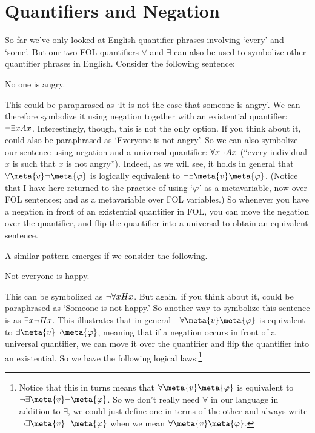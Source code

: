 \section{Quantifiers and Negation}




So far we've only looked at English quantifier phrases involving `every' and `some'.  But our two FOL quantifiers $\forall$ and $\exists$ can also be used to symbolize other quantifier phrases in English.  Consider the following sentence:
	\begin{earg}
		\item[\ex{q.neg1}] No one is angry.
	\end{earg}
This could be paraphrased as `It is not the case that someone is angry'.  We can therefore symbolize it using negation together with an existential quantifier: $\neg \exists x Ax$.  Interestingly, though, this is not the only option.  If you think about it,  could also be paraphrased as `Everyone is not-angry'. So we can also symbolize our sentence  using negation and a universal quantifier: $\forall x \neg Ax$ (``every individual $x$ is such that $x$ is not angry''). Indeed, as we will see, it holds in general that $\forall \meta{v} \enot\meta{\varphi}$ is logically equivalent to $\enot\exists \meta{v}\meta{\varphi}$. (Notice that I have here returned to the practice of using `$\mathcal{\varphi}$' as a metavariable, now over FOL sentences; and  as a metavariable over FOL variables.)   So whenever you have a negation in front of an existential quantifier in FOL, you can move the negation over the quantifier, and flip the quantifier into a universal to obtain an equivalent sentence.

A similar pattern emerges if we consider the following.
	\begin{earg}
		\item[\ex{q.neg2}] Not everyone is happy.
	\end{earg}
This can be symbolized as $\neg \forall x Hx$.  But again, if you think about it,  could be paraphrased as `Someone is not-happy.'  So another way to symbolize this sentence is as $\exists x\neg Hx$.  This illustrates that in general $\enot \forall \meta{v} \meta{\varphi}$ is equivalent to $\exists \meta{v} \enot \meta{\varphi}$, meaning that if a negation occurs in front of a universal quantifier, we can move it over the quantifier and flip the quantifier into an existential.  So we have the following logical laws:\footnote{Notice that this in turns means that $\forall \meta{v} \meta{\varphi}$ is equivalent to $\enot \exists\meta{v}  \enot  \meta{\varphi}$.  So we don't really need $\forall$ in our language in addition to $\exists$, we could just define one in terms of the other and always write $\enot \exists \meta{v} \enot  \meta{\varphi}$ when we mean $\forall \meta{v} \meta{\varphi}$.}

